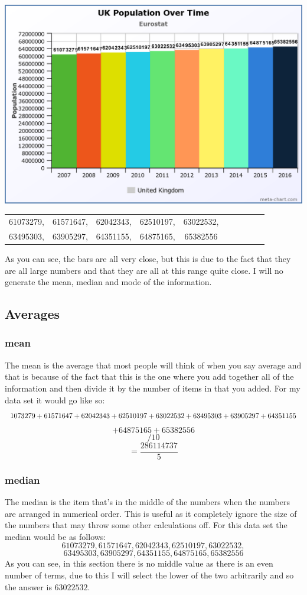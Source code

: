 \documentclass{article}
\begin{document}
\includegraphics[width=\linewidth]{u26a2chart.png}
\begin{center}
\begin{tabular}{ |c|c|c|c|c|c|c|c|c|c| } 
	61073279,& 61571647,& 62042343,& 62510197,& 63022532, \\
	63495303,& 63905297,& 64351155,& 64875165,& 65382556  
\end{tabular}
\end{center}

As you can see, the bars are all very close, but this is due to the fact that they are all large numbers and that they are all at this range quite close. I will no generate the mean, median and mode of the information. 
\subsection{Averages}
\subsubsection{mean}
The mean is the average that most people will think of when you say average and that is because of the fact that this is the one where you add together all of the information and then divide it by the number of items in that you added. For my data set it would go like so:
\[
	1073279	+61571647	+62042343	+62510197	+63022532	+63495303	+63905297	+64351155	\\ 
\]
\[
	+64875165	+65382556
\]
\[
	/ 10
\]
\[
=	\frac{286114737}{5} 
\]
\subsubsection{median}
The median is the item that's in the middle of the numbers when the numbers are arranged in numerical order. This is useful as it completely ignore the size of the numbers that may throw some other calculations off. For this data set the median would be as follows:
\[
	61073279,	61571647,	62042343,	62510197,	63022532,
\]
\[
	63495303,	63905297,	64351155,	64875165,	65382556
\]
As you can see, in this section there is no middle value as there is an even number of terms, due to this I will select the lower of the two arbitrarily and so the answer is $ 63022532$. 
\end{document}
